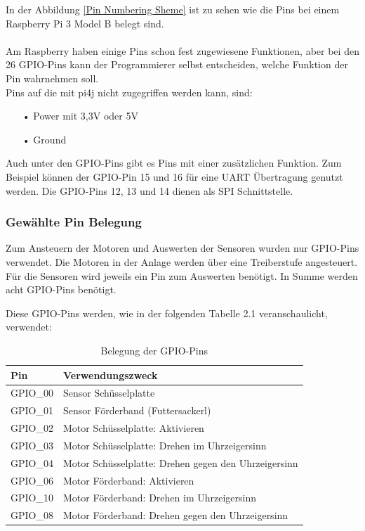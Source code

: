 
In der Abbildung \ref{Pin Numbering Sheme} ist zu sehen wie die Pins bei einem Raspberry Pi 3 Model B belegt sind.
\\ \\
Am Raspberry haben einige Pins schon fest zugewiesene Funktionen, aber bei den 26 \ac{GPIO}-Pins kann der Programmierer selbst entscheiden, welche Funktion der Pin wahrnehmen soll.
\\Pins auf die mit \ac{pi4j} nicht zugegriffen werden kann, sind:
\begin{itemize}
\item[•] Power mit 3,3V oder 5V
\item[•] Ground
\end{itemize}
\vspace{10pt}
Auch unter den \ac{GPIO}-Pins gibt es Pins mit einer zusätzlichen Funktion. Zum Beispiel können der \ac{GPIO}-Pin 15 und 16 für eine \ac{UART} Übertragung genutzt werden. Die \ac{GPIO}-Pins 12, 13 und 14 dienen als \ac{SPI} Schnittstelle.

\vspace{80pt}

\subsubsection{Gewählte Pin Belegung}
Zum Ansteuern der Motoren und Auswerten der Sensoren wurden nur \ac{GPIO}-Pins verwendet. Die Motoren in der Anlage werden über eine Treiberstufe angesteuert. Für die Sensoren wird jeweils ein Pin zum Auswerten benötigt. In Summe werden acht \ac{GPIO}-Pins benötigt. 

\newpage

Diese \ac{GPIO}-Pins werden, wie in der folgenden Tabelle 2.1 veranschaulicht, verwendet:

\begin{table}[htb]
\centering
\begin{tabular}{|l|l|}
\hline
\textbf{Pin} & \textbf{Verwendungszweck}          \\ \hline
\ac{GPIO}\_00     & Sensor Schüsselplatte              \\ \hline
\ac{GPIO}\_01     & Sensor Förderband (Futtersackerl)  \\ \hline
\ac{GPIO}\_02     & Motor Schüsselplatte: Aktivieren \\ \hline
\ac{GPIO}\_03     & Motor Schüsselplatte: Drehen im Uhrzeigersinn \\ \hline
\ac{GPIO}\_04     & Motor Schüsselplatte: Drehen gegen den Uhrzeigersinn \\ \hline
\ac{GPIO}\_06     & Motor Förderband: Aktivieren     \\ \hline
\ac{GPIO}\_10     & Motor Förderband: Drehen im Uhrzeigersinn     \\ \hline
\ac{GPIO}\_08     & Motor Förderband: Drehen gegen den Uhrzeigersinn     \\ \hline
\end{tabular}
\caption{Belegung der \ac{GPIO}-Pins}
\label{Pinbelegung}
\end{table}

